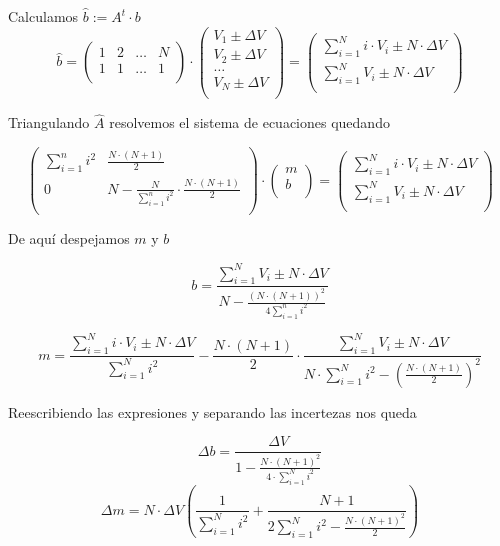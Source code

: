 Calculamos $\hat{b} := A^t \cdot b$
$$ \hat{b} =
\begin{pmatrix} 
1 & 2 & \dots & N \\
1 & 1 & \dots & 1 \\
\end{pmatrix}
\cdot
\begin{pmatrix} 
V_1 \pm \Delta V \\
V_2 \pm \Delta V \\
\dots \\
V_N \pm \Delta V \\
\end{pmatrix}
=
\begin{pmatrix}
\sum_{i=1}^{N}{i \cdot V_i} \pm N \cdot \Delta V \\
\sum_{i=1}^{N}{V_i} \pm N \cdot \Delta V \\
\end{pmatrix}
$$

Triangulando $\hat{A}$ resolvemos el sistema de ecuaciones quedando

$$
\begin{pmatrix}
\sum_{i=1}^{n}{i^2} & \frac{N \cdot (N+1)}{2} \\
0 & N - \frac{N}{\sum_{i=1}^{n}{i^2}} \cdot \frac{N \cdot (N+1)}{2} \\
\end{pmatrix}
\cdot
\begin{pmatrix}
m \\
b \\
\end{pmatrix}
=
\begin{pmatrix}
\sum_{i=1}^{N}{i \cdot V_i} \pm N \cdot \Delta V \\
\sum_{i=1}^{N}{V_i} \pm N \cdot \Delta V \\
\end{pmatrix}
$$

De aquí despejamos $m$ y $b$

$$
b = \frac{\sum_{i=1}^{N}{V_i} \pm N \cdot \Delta V}{N - \frac{(N \cdot (N+1))^2}{4 \sum_{i=1}^{n}{i^2}}}
$$

$$
m = \frac{\sum_{i=1}^{N}{i \cdot V_i} \pm N \cdot \Delta V}{\sum_{i=1}^{N}{i^2}} - \frac{N \cdot (N+1)}{2} \cdot \frac{\sum_{i=1}^{N}{V_i} \pm N \cdot \Delta V}{N \cdot \sum_{i=1}^{N}{i^2} - (\frac{N \cdot (N+1)}{2})^2}
$$

Reescribiendo las expresiones y separando las incertezas nos queda

$$
\Delta b = \frac{\Delta V}{1 - \frac{N \cdot (N+1)^2}{4 \cdot \sum_{i=1}^{N}{i^2}}}
$$
$$
\Delta m = N \cdot \Delta V \left(\frac{1}{\sum_{i=1}^{N}{i^2}} + \frac{N+1}{2\sum_{i=1}^{N}{i^2} - \frac{N \cdot (N+1)^2}{2}}\right)
$$
